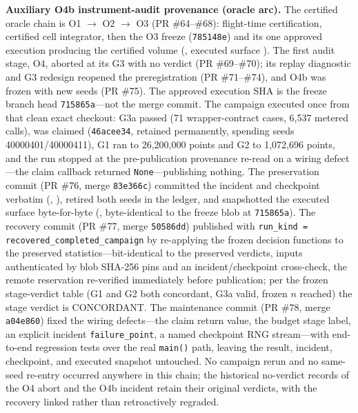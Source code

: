 \textbf{Auxiliary O4b instrument-audit provenance (oracle arc).} The
certified oracle chain is O1 $\to$ O2 $\to$ O3 (PR \#64--\#68):
flight-time certification, certified cell integrator, then the O3 freeze
(\texttt{785148e}) and its one approved execution producing the certified
volume (, executed surface
). The first audit
stage, O4, aborted at its G3 with no verdict (PR \#69--\#70); its replay
diagnostic and G3 redesign reopened the preregistration (PR \#71--\#74),
and O4b was frozen with new seeds (PR \#75). The approved execution SHA
is the freeze branch head \texttt{715865a}---not the merge commit. The
campaign executed once from that clean exact checkout: G3a passed (71
wrapper-contract cases, 6,537 metered calls),
 was claimed (\texttt{46acee34}, retained
permanently, spending seeds 40000401/40000411), G1 ran to 26,200,000
points and G2 to 1,072,696 points, and the run stopped at the
pre-publication provenance re-read on a wiring defect---the claim
callback returned \texttt{None}---publishing nothing. The preservation
commit (PR \#76, merge \texttt{83e366c}) committed the incident and
checkpoint verbatim (,
), retired both seeds in the ledger,
and snapshotted the executed surface byte-for-byte
(, byte-identical to
the freeze blob at \texttt{715865a}). The recovery commit (PR \#77, merge
\texttt{50586dd}) published  with
\texttt{run\_kind = recovered\_completed\_campaign} by re-applying the
frozen decision functions to the preserved statistics---bit-identical to
the preserved verdicts, inputs authenticated by blob SHA-256 pins and an
incident/checkpoint cross-check, the remote reservation re-verified
immediately before publication; per the frozen stage-verdict table (G1
and G2 both concordant, G3a valid, frozen $n$ reached) the stage verdict
is CONCORDANT. The maintenance commit (PR \#78, merge \texttt{a04e860})
fixed the wiring defects---the claim return value, the budget stage
label, an explicit incident \texttt{failure\_point}, a named checkpoint
RNG stream---with end-to-end regression tests over the real
\texttt{main()} path, leaving the result, incident, checkpoint, and
executed snapshot untouched. No campaign rerun and no same-seed re-entry
occurred anywhere in this chain; the historical no-verdict records of the
O4 abort and the O4b incident retain their original verdicts, with the
recovery linked rather than retroactively regraded.

